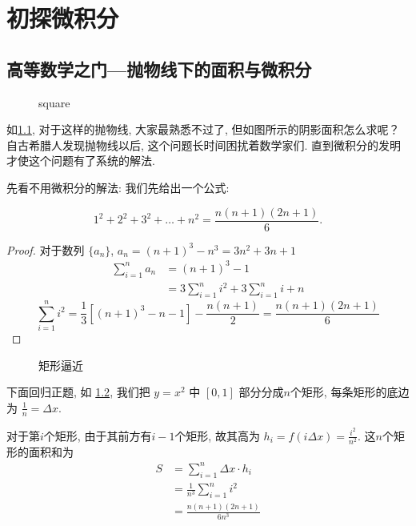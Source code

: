 \chapter{初探微积分}

\section{高等数学之门---抛物线下的面积与微积分}

\begin{figure}
  \centering
    
  \caption{square}\label{fig:square}
\end{figure}

如\cref{fig:square}, 对于这样的抛物线, 大家最熟悉不过了, 但如图所示的阴影面积怎么求呢？
自古希腊人发现抛物线以后, 这个问题长时间困扰着数学家们.
直到微积分的发明才使这个问题有了系统的解法.

先看不用微积分的解法:
我们先给出一个公式:

\[
  1^{2}+2^{2}+3^{2}+\ldots + n^{2} = \frac{n(n+1)(2n+1)}{6}
.\]

\begin{proof}
  对于数列 $\{a_{n}\} $, $a_n = (n+1)^{3}- n ^{3} = 3n^{2}+3n+1$
  \begin{align}
    \sum_{i=1}^{n} a_n & = (n+1)^{3}-1                                     \\
    & = 3 \sum_{i=1}^{n} i^{2} + 3 \sum_{i=1}^{n} i + n
  \end{align}
  \begin{equation*}
    \sum_{i=1}^{n} i^{2} = \frac{1}{3} \left[(n+1)^{3} -n -1 \right]
    - \frac{n(n+1)}{2}  = \frac{n(n+1)(2n+1)}{6}
  \end{equation*}
\end{proof}

\begin{figure}
  \centering
    
  \caption{矩形逼近} \label{fig:rect}
\end{figure}

下面回归正题,
如 \cref{fig:rect}, 我们把 $y=x^{2} $ 中 $[0, 1]$ 部分分成$n$个矩形,
每条矩形的底边为 $ \frac{1}{n} = \Delta x $.

对于第$i$个矩形, 由于其前方有$i-1$个矩形,
故其高为 $h_i = f(i \Delta x) = \frac{i^{2}}{n^{2} } $.
这$n$个矩形的面积和为
\begin{align*}
  S & = \sum_{i=1}^{n} \Delta x \cdot h_i  \\
  & = \frac{1}{n^3} \sum_{i=1}^{n} i^{2} \\
  & = \frac{n(n+1)(2n+1)}{6n^3 }
\end{align*}

